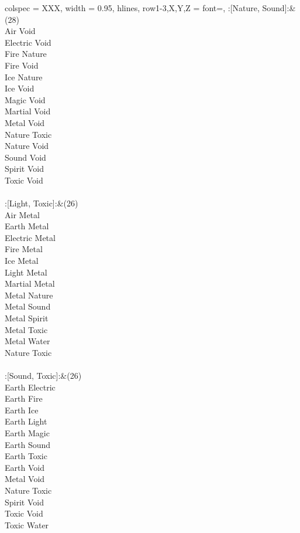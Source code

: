 \begin{longtblr}[
	caption = {2v2 Defending Resisted},
	label = {2v2-Defending-Resisted},
]{
	colspec = {XXX}, width = 0.95\linewidth,
	hlines,
	row{1-3,X,Y,Z} = {font=\bfseries},
}
	:[Nature, Sound]:&{(28)\\
	Air Void \\
	Electric Void \\
	Fire Nature \\
	Fire Void \\
	Ice Nature \\
	Ice Void \\
	Magic Void \\
	Martial Void \\
	Metal Void \\
	Nature Toxic \\
	Nature Void \\
	Sound Void \\
	Spirit Void \\
	Toxic Void \\
	}\\

	:[Light, Toxic]:&{(26)\\
	Air Metal \\
	Earth Metal \\
	Electric Metal \\
	Fire Metal \\
	Ice Metal \\
	Light Metal \\
	Martial Metal \\
	Metal Nature \\
	Metal Sound \\
	Metal Spirit \\
	Metal Toxic \\
	Metal Water \\
	Nature Toxic \\
	}\\

	:[Sound, Toxic]:&{(26)\\
	Earth Electric \\
	Earth Fire \\
	Earth Ice \\
	Earth Light \\
	Earth Magic \\
	Earth Sound \\
	Earth Toxic \\
	Earth Void \\
	Metal Void \\
	Nature Toxic \\
	Spirit Void \\
	Toxic Void \\
	Toxic Water \\
	}\\


\end{longtblr}
